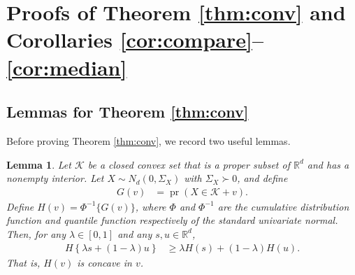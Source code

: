 \documentclass[11pt]{article}
\newcommand{\1}{\mathbbm{1}}
\def\pr{{\operatorname{pr}}}
\theoremstyle{plain}
\newtheorem{lemma}[theorem]{Lemma}
\theoremstyle{definition}
\begin{document}
\section{Proofs of Theorem \ref{thm:conv} and Corollaries \ref{cor:compare}--\ref{cor:median}}\label{sec:proof}
\subsection{Lemmas for Theorem \ref{thm:conv}}
Before proving Theorem \ref{thm:conv}, we record two useful lemmas.
\begin{lemma}\label{lem:concave}
Let $\mathcal{K}$ be a closed convex set that is a proper subset of $\mathbb{R}^d$ and has a nonempty interior. Let $X\sim N_d(0, \Sigma_X)$ with $\Sigma_X\succ 0$, and define 
\begin{align} G(v) &= \pr(X\in \mathcal{K}+v). \label{eq:G}\end{align}Define $H(v) = \Phi^{-1}\{G(v)\}$, where $\Phi$ and $\Phi^{-1}$ are the cumulative distribution function and quantile function respectively of the standard univariate normal. Then, for any $\lambda \in [0,1]$ and any $s,u \in \mathbb{R}^d$, 
\begin{align}\label{eq:concave}
H \left\{\lambda s + (1-\lambda)u\right\}  &\geq \lambda H(s) + (1-\lambda)H(u).
\end{align}
That is, $H(v)$ is concave in $v$.


\end{lemma}
\end{document}
